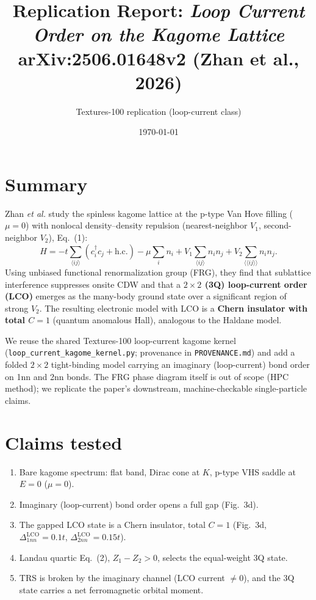 \documentclass[11pt]{article}
\title{Replication Report: \textit{Loop Current Order on the Kagome Lattice}\\
\large arXiv:2506.01648v2 (Zhan et al., 2026)}
\author{Textures-100 replication (loop-current class)}
\date{\today}
\begin{document}
\maketitle

\section{Summary}
Zhan \emph{et al.} study the spinless kagome lattice at the p-type Van Hove
filling ($\mu=0$) with nonlocal density--density repulsion (nearest-neighbor
$V_1$, second-neighbor $V_2$), Eq.~(1):
\[
H=-t\!\sum_{\langle ij\rangle}\!(c^\dagger_i c_j+\text{h.c.})-\mu\sum_i n_i
+V_1\!\sum_{\langle ij\rangle}\! n_i n_j+V_2\!\!\sum_{\langle\langle ij\rangle\rangle}\!\! n_i n_j .
\]
Using unbiased functional renormalization group (FRG), they find that
sublattice interference suppresses onsite CDW and that a \textbf{$2\times2$ (3Q)
loop-current order (LCO)} emerges as the many-body ground state over a
significant region of strong $V_2$. The resulting electronic model with LCO
is a \textbf{Chern insulator with total $C=1$} (quantum anomalous Hall),
analogous to the Haldane model.

We reuse the shared Textures-100 loop-current kagome kernel
(\texttt{loop\_current\_kagome\_kernel.py}; provenance in
\texttt{PROVENANCE.md}) and add a folded $2\times2$ tight-binding model
carrying an imaginary (loop-current) bond order on 1nn and 2nn bonds. The
FRG phase diagram itself is out of scope (HPC method); we replicate the
paper's downstream, machine-checkable single-particle claims.

\section{Claims tested}
\begin{enumerate}
\item[\textbf{A}] Bare kagome spectrum: flat band, Dirac cone at $K$, p-type
VHS saddle at $E=0$ ($\mu=0$).
\item[\textbf{B}] Imaginary (loop-current) bond order opens a full gap
(Fig.~3d).
\item[\textbf{C}] The gapped LCO state is a Chern insulator, total $C=1$
(Fig.~3d, $\Delta^{\text{LCO}}_{1nn}=0.1t$, $\Delta^{\text{LCO}}_{2nn}=0.15t$).
\item[\textbf{D}] Landau quartic Eq.~(2), $Z_1-Z_2>0$, selects the
equal-weight 3Q state.
\item[\textbf{E}] TRS is broken by the imaginary channel (LCO current $\neq0$),
and the 3Q state carries a net ferromagnetic orbital moment.
\end{enumerate}
\end{document}
